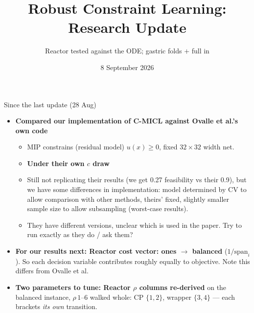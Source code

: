 \documentclass{beamer}
\title{Robust Constraint Learning: Research Update}
\subtitle{Reactor tested against the ODE; gastric folds $+$ full in}
\date{8 September 2026}
\begin{document}
\begin{frame}{Since the last update (28 Aug)}
    \scriptsize
    \begin{itemize}
        \item \textbf{Compared our implementation of C-MICL against Ovalle et al.'s own code}
              \begin{itemize}\scriptsize
                  \item MIP constrains (residual model) $u(x)\ge0$, fixed $32{\times}32$ width net.
                  \item \textbf{Under their own $c$ draw}
                  \item Still not replicating their results (we get 0.27 feasibility vs their 0.9), but we have
                        some differences in implementation: model determined by CV to allow comparison
                        with other methods, theirs' fixed, slightly smaller sample size to allow
                        subsampling (worst-case results).
                  \item They have different versions, unclear which is used in the paper.
                        Try to run exactly as they do / ask them?
              \end{itemize}
        \item \textbf{For our results next: Reactor cost vector: ones $\to$ balanced} ($1/\text{span}_i$).
              So each decision variable contributes roughly equally to objective. Note this differs from Ovalle et al.
        \item \textbf{Two parameters to tune: Reactor $\rho$ columns re-derived} on the balanced instance,
              $\rho\,1$--$6$ walked whole: CP $\{1,2\}$, wrapper $\{3,4\}$ ---
              each brackets \emph{its own} transition.
    \end{itemize}
\end{frame}
\end{document}
